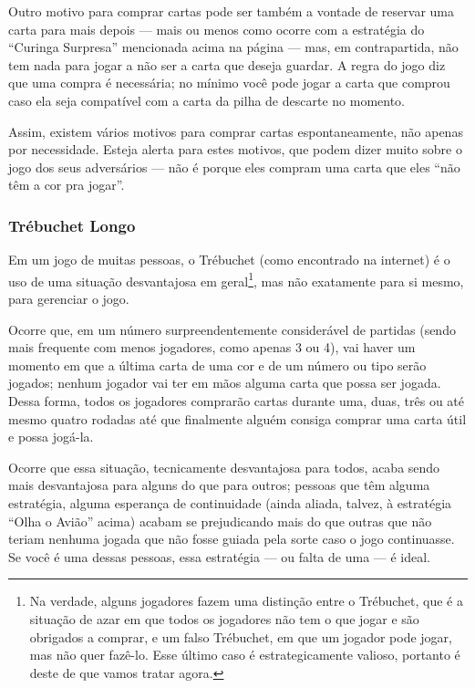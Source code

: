 Outro motivo para comprar cartas pode ser também a vontade de reservar uma carta para mais depois --- mais ou menos como ocorre com a estratégia do ``Curinga Surpresa'' mencionada acima na página \pageref{curingasurpresa} --- mas, em contrapartida, não tem nada para jogar a não ser a carta que deseja guardar. A regra do jogo diz que uma compra é necessária; no mínimo você pode jogar a carta que comprou caso ela seja compatível com a carta da pilha de descarte no momento.

Assim, existem vários motivos para comprar cartas espontaneamente, não apenas por necessidade. Esteja alerta para estes motivos, que podem dizer muito sobre o jogo dos seus adversários --- não é porque eles compram uma carta que eles ``não têm a cor pra jogar''.

\subsubsection{Trébuchet Longo}

\label{trebuchetlongo}

Em um jogo de muitas pessoas, o Trébuchet (como encontrado na internet) é o uso de uma situação desvantajosa em geral\footnote{Na verdade, alguns jogadores fazem uma distinção entre o Trébuchet, que é a situação de azar em que todos os jogadores não tem o que jogar e são obrigados a comprar, e um falso Trébuchet, em que um jogador pode jogar, mas não quer fazê-lo. Esse último caso é estrategicamente valioso, portanto é deste de que vamos tratar agora.}, mas não exatamente para si mesmo, para gerenciar o jogo.

Ocorre que, em um número surpreendentemente considerável de partidas (sendo mais frequente com menos jogadores, como apenas 3 ou 4), vai haver um momento em que a última carta de uma cor e de um número ou tipo serão jogados; nenhum jogador vai ter em mãos alguma carta que possa ser jogada. Dessa forma, todos os jogadores comprarão cartas durante uma, duas, três ou até mesmo quatro rodadas até que finalmente alguém consiga comprar uma carta útil e possa jogá-la.

Ocorre que essa situação, tecnicamente desvantajosa para todos, acaba sendo mais desvantajosa para alguns do que para outros; pessoas que têm alguma estratégia, alguma esperança de continuidade (ainda aliada, talvez, à estratégia ``Olha o Avião'' acima) acabam se prejudicando mais do que outras que não teriam nenhuma jogada que não fosse guiada pela sorte caso o jogo continuasse. Se você é uma dessas pessoas, essa estratégia --- ou falta de uma --- é ideal.

